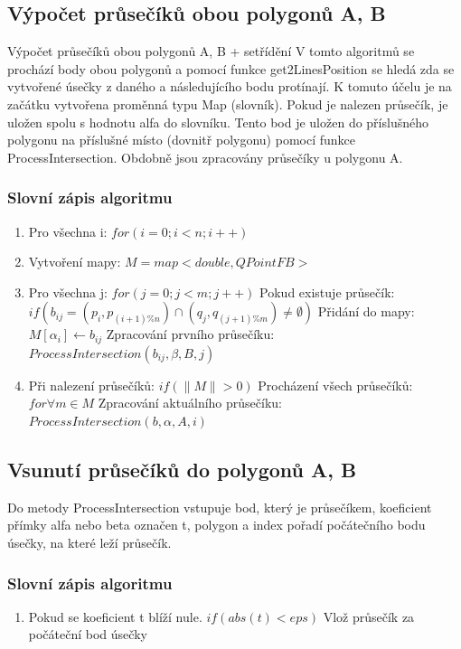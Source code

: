 \documentclass[a4paper,11pt,twoside]{article}
\begin{document}
\subsection{Výpočet průsečíků obou polygonů A, B}
\noindent Výpočet průsečíků obou polygonů A, B + setřídění
V tomto algoritmů se prochází body obou polygonů a pomocí funkce get2LinesPosition se hledá zda se vytvořené úsečky z daného a následujícího bodu protínají. K tomuto účelu je na začátku vytvořena proměnná typu Map (slovník). Pokud je nalezen průsečík, je uložen spolu s hodnotu alfa do slovníku. Tento bod je uložen do příslušného polygonu na příslušné místo (dovnitř polygonu) pomocí funkce  ProcessIntersection. Obdobně jsou zpracovány průsečíky u polygonu A.

\subsubsection{Slovní zápis algoritmu}
\begin{enumerate}
\item Pro všechna i: $for (i = 0; i < n; i++)$
\item Vytvoření mapy: $ M = map<double, QPointFB>$
\item Pro všechna j: $for (j = 0; j < m; j++)$
\subitem Pokud existuje průsečík: $if (b_{ij} = (p_i, p_{(i+1)\%n}) \cap (q_j, q_{(j+1)\%m})  \neq \emptyset  )$
\subitem Přidání do mapy: $M[\alpha_i] \leftarrow b_{ij}$
\subitem Zpracování prvního průsečíku: $ProcessIntersection (b_{ij}, \beta, B, j)$
\item Při nalezení průsečíků: $if (\| M \| > 0) $
\subitem Procházení všech průsečíků: $for \forall m \in M$
\subitem Zpracování aktuálního průsečíku: $ProcessIntersection(b, \alpha, A, i)$
\end{enumerate}

\subsection{Vsunutí průsečíků do polygonů A, B}
Do metody ProcessIntersection vstupuje bod, který je průsečíkem, koeficient přímky alfa nebo beta označen t, polygon a index pořadí počátečního bodu úsečky, na které leží průsečík.

\subsubsection{Slovní zápis algoritmu}
\begin{enumerate}
\item Pokud se koeficient t blíží nule. $ if( abs(t) < eps )$
\subitem Vlož průsečík za počáteční bod úsečky
\end{enumerate}
\end{document}
